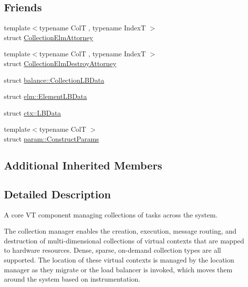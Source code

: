 \subsection*{Friends}
\begin{DoxyCompactItemize}
\item 
{\footnotesize template$<$typename ColT , typename IndexT $>$ }\\struct \hyperlink{structvt_1_1vrt_1_1collection_1_1_collection_manager_aafd1972e5767dec26c8872f4aafa6864}{Collection\+Elm\+Attorney}
\item 
{\footnotesize template$<$typename ColT , typename IndexT $>$ }\\struct \hyperlink{structvt_1_1vrt_1_1collection_1_1_collection_manager_a4089cdff4218109fffb5884f51244a6e}{Collection\+Elm\+Destroy\+Attorney}
\item 
struct \hyperlink{structvt_1_1vrt_1_1collection_1_1_collection_manager_a3327134906c684111aa2604d0b68b2f0}{balance\+::\+Collection\+L\+B\+Data}
\item 
struct \hyperlink{structvt_1_1vrt_1_1collection_1_1_collection_manager_ad7473f6d171ebb8fb5307d93902ae9ae}{elm\+::\+Element\+L\+B\+Data}
\item 
struct \hyperlink{structvt_1_1vrt_1_1collection_1_1_collection_manager_ae36dc42a5f1469dbe9c49bdce96beae3}{ctx\+::\+L\+B\+Data}
\item 
{\footnotesize template$<$typename ColT $>$ }\\struct \hyperlink{structvt_1_1vrt_1_1collection_1_1_collection_manager_ad0b203d69106aa09d916dda269d0604d}{param\+::\+Construct\+Params}
\end{DoxyCompactItemize}
\subsection*{Additional Inherited Members}


\subsection{Detailed Description}
A core VT component managing collections of tasks across the system. 

The collection manager enables the creation, execution, message routing, and destruction of multi-\/dimensional collections of virtual contexts that are mapped to hardware resources. Dense, sparse, on-\/demand collection types are all supported. The location of these virtual contexts is managed by the location manager as they migrate or the load balancer is invoked, which moves them around the system based on instrumentation. 

